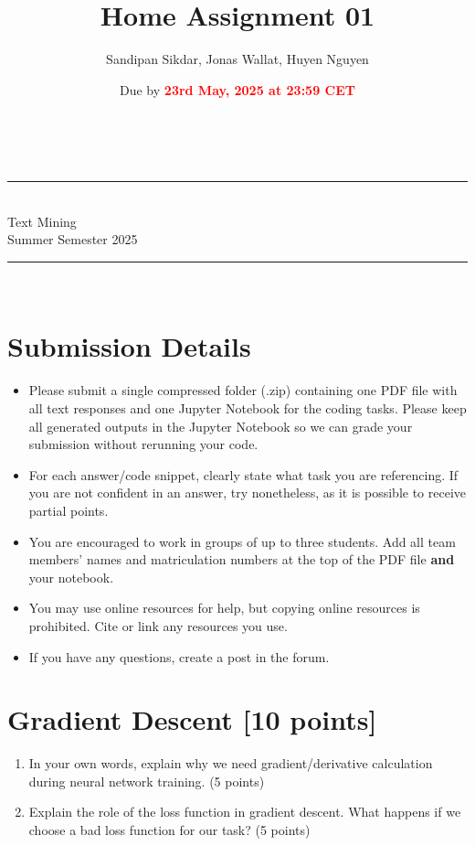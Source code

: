 \documentclass[a4paper,11pt]{article}
\makeatletter
\newcommand{\linia}{\rule{\linewidth}{0.5pt}}
\theoremstyle{mytheor}
\renewcommand{\maketitle}{
\begin{center}
\vspace{2ex}
{\huge \textsc{\@title}}
\vspace{1ex}
\\
\linia\\
Text Mining \hfill \@date\\
\@author \hfill Summer Semester 2025\\
\linia\\
\vspace{2ex}
\end{center}
}
\makeatother
\begin{document}

\title{Home Assignment 01}

\author{Sandipan Sikdar, Jonas Wallat, Huyen Nguyen}

\date{Due by \textbf{\textcolor{red}{23rd May, 2025 at 23:59 CET}}}

\maketitle

\section*{Submission Details}
\begin{itemize}
    \item Please submit a single compressed folder (.zip) containing one PDF file with all text responses and one Jupyter Notebook for the coding tasks. Please keep all generated outputs in the Jupyter Notebook so we can grade your submission without rerunning your code.
    \item For each answer/code snippet, clearly state what task you are referencing. If you are not confident in an answer, try nonetheless, as it is possible to receive partial points.
    \item You are encouraged to work in groups of up to three students. Add all team members' names and matriculation numbers at the top of the PDF file \textbf{and} your notebook.
    \item You may use online resources for help, but copying online resources is prohibited. Cite or link any resources you use.
    \item If you have any questions, create a post in the forum.
\end{itemize}

\section{Gradient Descent [10 points]}
\begin{enumerate}
    \item In your own words, explain why we need gradient/derivative calculation during neural network training. (5 points)
    \item Explain the role of the loss function in gradient descent. What happens if we choose a bad loss function for our task? (5 points) 
\end{enumerate}
\end{document}
